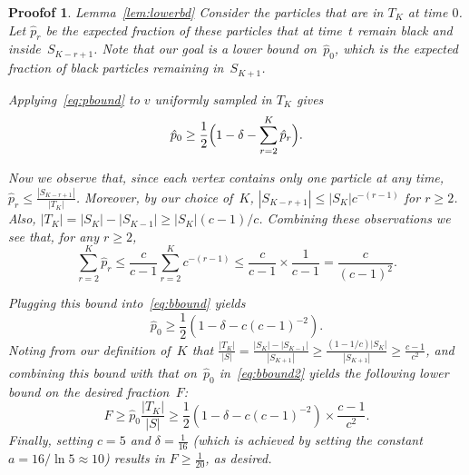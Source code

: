 \documentclass[10pt,a4paper]{amsart}
\newtheorem{proofof}{Proofof}
\begin{document}
\begin{proofof}{Lemma~\ref{lem:lowerbd}}
Consider the particles that are in $T_K$ at time $0$. Let $\hat p_r$ be the expected fraction of these particles
that at time~$t$ remain black and inside~$S_{K-r+1}$.  Note that our goal is a lower bound on~$\hat p_0$, which 
is the expected fraction of black particles remaining in~$S_{K+1}$.

Applying~\eqref{eq:pbound} to $v$ uniformly sampled in $T_K$ gives
\begin{equation}\label{eq:bbound}
    \hat p_0 \ge \frac{1}{2}\Bigl(1-\delta - \sum_{r=2}^K \hat p_r\Bigr).
\end{equation}    

Now we observe that, since each vertex contains only one particle at any time,
$\hat p_r \le \frac{|S_{K-r+1}|}{|T_K|}$.  Moreover, by our choice of~$K$,
$|S_{K-r+1}|\leq |S_K|c^{-(r-1)}$ for $r\ge 2$.  Also, $|T_K| = |S_K|-|S_{K-1}|\geq |S_K|(c-1)/c$.
Combining these observations we see that, for any $r\ge 2$,
$$
   \sum_{r=2}^K \hat p_r  \leq \frac{c}{c-1}\sum_{r=2}^K  c^{-(r-1)} 
           \leq \frac{c}{c-1} \times \frac{1}{c-1} = \frac{c}{(c-1)^2}.  $$

Plugging this bound into~\eqref{eq:bbound} yields
\begin{equation}\label{eq:bbound2}
   \hat p_0 \ge \frac{1}{2}(1-\delta -c(c-1)^{-2}).
\end{equation}   
Noting from our definition of~$K$ that 
$\frac{|T_K|}{|S|} = \frac{|S_K|-|S_{K-1}|}{|S_{K+1}|} \ge \frac{(1-1/c)|S_K|}{|S_{K+1}|} \ge \frac{c-1}{c^2}$,
and combining this bound with that on~$\hat p_0$ in~\eqref{eq:bbound2} yields the following lower bound on the desired
fraction~$F$: $$
    F\ge \hat p_0\frac{|T_K|}{|S|} \ge \frac{1}{2}(1-\delta -c(c-1)^{-2})\times \frac{c-1}{c^2}.  $$
Finally, setting $c=5$ and $\delta=\frac{1}{16}$ (which is achieved by setting the constant $a=16/\ln 5\approx 10$) 
results in $F\ge\frac{1}{20}$, as desired.
\end{proofof}
\end{document}
